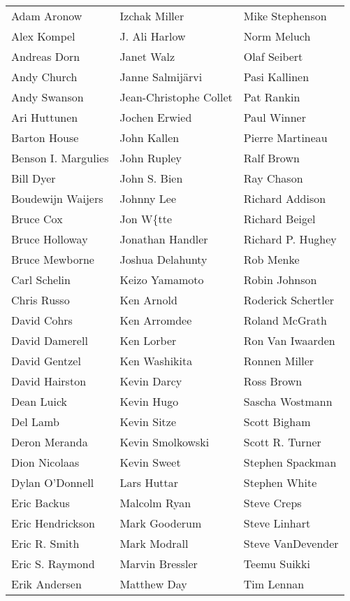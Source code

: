 \begin{center}
\begin{tabular}{lll}
Adam Aronow & Izchak Miller & Mike Stephenson\\
Alex Kompel & J. Ali Harlow & Norm Meluch\\
Andreas Dorn & Janet Walz & Olaf Seibert\\
Andy Church & Janne Salmij\"{a}rvi & Pasi Kallinen\\
Andy Swanson & Jean-Christophe Collet & Pat Rankin\\
Ari Huttunen & Jochen Erwied & Paul Winner\\
Barton House & John Kallen & Pierre Martineau\\
Benson I. Margulies & John Rupley & Ralf Brown\\
Bill Dyer & John S. Bien & Ray Chason\\
Boudewijn Waijers & Johnny Lee & Richard Addison\\
Bruce Cox & Jon W\{tte & Richard Beigel\\
Bruce Holloway & Jonathan Handler & Richard P. Hughey\\
Bruce Mewborne & Joshua Delahunty & Rob Menke\\
Carl Schelin & Keizo Yamamoto & Robin Johnson\\
Chris Russo & Ken Arnold & Roderick Schertler\\
David Cohrs & Ken Arromdee & Roland McGrath\\
David Damerell & Ken Lorber & Ron Van Iwaarden\\
David Gentzel & Ken Washikita & Ronnen Miller\\
David Hairston & Kevin Darcy & Ross Brown\\
Dean Luick & Kevin Hugo & Sascha Wostmann\\
Del Lamb & Kevin Sitze & Scott Bigham\\
Deron Meranda & Kevin Smolkowski & Scott R. Turner\\
Dion Nicolaas & Kevin Sweet & Stephen Spackman\\
Dylan O'Donnell & Lars Huttar & Stephen White\\
Eric Backus & Malcolm Ryan & Steve Creps\\
Eric Hendrickson & Mark Gooderum & Steve Linhart\\
Eric R. Smith & Mark Modrall & Steve VanDevender\\
Eric S. Raymond & Marvin Bressler & Teemu Suikki\\
Erik Andersen & Matthew Day & Tim Lennan\\

\end{tabular}
\end{center}
